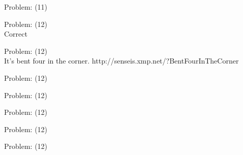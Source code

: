 \documentclass[11pt]{article}
\begin{document}
\begin{minipage}[t]{0.5\textwidth}
  {\centering
  
Problem: (11)\\
  }
\end{minipage}
\begin{minipage}[t]{0.5\textwidth}
  {\centering
  
Problem: (12)\\
Correct\\
  }
\end{minipage}
\begin{minipage}[t]{0.5\textwidth}
  {\centering
  
Problem: (12)\\
It's bent four in the corner. http://senseis.xmp.net/?BentFourInTheCorner\\
  }
\end{minipage}
\begin{minipage}[t]{0.5\textwidth}
  {\centering
  
Problem: (12)\\
  }
\end{minipage}
\begin{minipage}[t]{0.5\textwidth}
  {\centering
  
Problem: (12)\\
  }
\end{minipage}
\begin{minipage}[t]{0.5\textwidth}
  {\centering
  
Problem: (12)\\
  }
\end{minipage}
\begin{minipage}[t]{0.5\textwidth}
  {\centering
  
Problem: (12)\\
  }
\end{minipage}
\begin{minipage}[t]{0.5\textwidth}
  {\centering
  
Problem: (12)\\
  }
\end{minipage}
\end{document}

